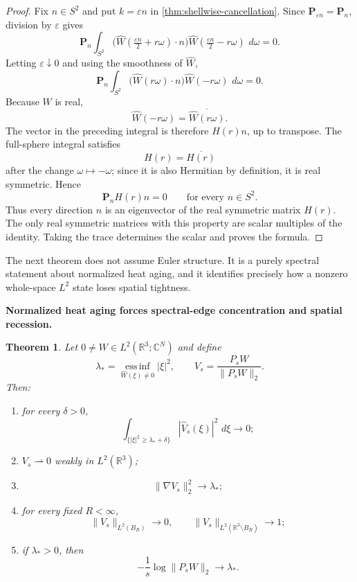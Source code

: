 \documentclass[11pt]{article}
\newtheorem{theorem}{Theorem}[section]
\theoremstyle{definition}\newtheorem{problem}[theorem]{Problem}
\theoremstyle{definition}
\theoremstyle{remark}
\newcommand{\R}{\mathbb R}
\newcommand{\dd}{\,d}
\begin{document}
\begin{proof}
Fix \(n\in S^2\) and put \(k=\varepsilon n\) in
\cref{thm:shellwise-cancellation}.  Since
\(\mathbf P_{\varepsilon n}=\mathbf P_n\), division by \(\varepsilon\) gives
\[
 \mathbf P_n
 \int_{S^2}
 \bigl(\widehat W(\tfrac{\varepsilon n}{2}+r\omega)\cdot n\bigr)
 \widehat W(\tfrac{\varepsilon n}{2}-r\omega)\,\dd\omega=0.
\]
Letting \(\varepsilon\downarrow0\) and using the smoothness of
\(\widehat W\),
\[
 \mathbf P_n
 \int_{S^2}
 \bigl(\widehat W(r\omega)\cdot n\bigr)
 \widehat W(-r\omega)\,\dd\omega=0.
\]
Because \(W\) is real,
\[
 \widehat W(-r\omega)=\overline{\widehat W(r\omega)}.
\]
The vector in the preceding integral is therefore \(H(r)n\), up to transpose.
The full-sphere integral satisfies
\[
 H(r)=\overline{H(r)}
\]
after the change \(\omega\mapsto-\omega\); since it is also Hermitian by
definition, it is real symmetric.  Hence
\[
 \mathbf P_n H(r)n=0
 \qquad\text{for every }n\in S^2.
\]
Thus every direction \(n\) is an eigenvector of the real symmetric matrix
\(H(r)\).  The only real symmetric matrices with this property are scalar
multiples of the identity.  Taking the trace determines the scalar and proves
the formula.
\end{proof}

The next theorem does not assume Euler structure.  It is a purely spectral
statement about normalized heat aging, and it identifies precisely how a
nonzero whole-space \(L^2\) state loses spatial tightness.

\medskip
\noindent\textbf{Normalized heat aging forces spectral-edge concentration and spatial recession.}
\begin{theorem}\label{thm:spectral-edge-recession}
Let \(0\ne W\in L^2(\R^3;\mathbb C^N)\) and define
\[
 \lambda_*=
 \operatorname*{ess\,inf}_{\widehat W(\xi)\ne0}|\xi|^2,
 \qquad
 V_s=\frac{P_sW}{\|P_sW\|_2}.
\]
Then:
\begin{enumerate}[label=\textup{(\roman*)},leftmargin=*]
\item for every \(\delta>0\),
\[
 \int_{\{|\xi|^2\ge\lambda_*+\delta\}}
 |\widehat V_s(\xi)|^2\,\dd\xi\longrightarrow0;
\]
\item \(V_s\rightharpoonup0\) weakly in \(L^2(\R^3)\);
\item
\[
 \|\nabla V_s\|_2^2\longrightarrow\lambda_*;
\]
\item for every fixed \(R<\infty\),
\[
 \boxed{
 \|V_s\|_{L^2(B_R)}\longrightarrow0,
 \qquad
 \|V_s\|_{L^2(\R^3\setminus B_R)}\longrightarrow1;
 }
\]
\item if \(\lambda_*>0\), then
\[
 \boxed{
 -\frac1s\log\|P_sW\|_2\longrightarrow\lambda_*.
 }
\]
\end{enumerate}
\end{theorem}
\end{document}
